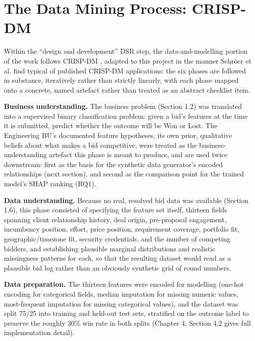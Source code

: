 \documentclass[12pt,oneside]{report}
\begin{document}
\hypertarget{the-data-mining-process-crisp-dm}{%
\section{The Data Mining Process:
CRISP-DM}\label{the-data-mining-process-crisp-dm}}

Within the ``design and development'' DSR step, the data-and-modelling
portion of the work follows CRISP-DM \citep{chapman2000crispdm}, adapted
to this project in the manner Schröer et al.
\citep{schroer2021systematic} find typical of published CRISP-DM
applications: the six phases are followed in substance, iteratively
rather than strictly linearly, with each phase mapped onto a concrete,
named artefact rather than treated as an abstract checklist item.

\textbf{Business understanding.} The business problem (Section 1.2) was
translated into a supervised binary classification problem: given a
bid's features at the time it is submitted, predict whether the outcome
will be Won or Lost. The Engineering BU's documented feature hypotheses,
its own prior, qualitative beliefs about what makes a bid competitive,
were treated as the business-understanding artefact this phase is meant
to produce, and are used twice downstream: first as the basis for the
synthetic data generator's encoded relationships (next section), and
second as the comparison point for the trained model's SHAP ranking
(RQ1).

\textbf{Data understanding.} Because no real, resolved bid data was
available (Section 1.6), this phase consisted of specifying the feature
set itself, thirteen fields spanning client relationship history, deal
origin, pre-proposal engagement, incumbency position, effort, price
position, requirement coverage, portfolio fit, geographic/timezone fit,
security credentials, and the number of competing bidders, and
establishing plausible marginal distributions and realistic missingness
patterns for each, so that the resulting dataset would read as a
plausible bid log rather than an obviously synthetic grid of round
numbers.

\textbf{Data preparation.} The thirteen features were encoded for
modelling (one-hot encoding for categorical fields, median imputation
for missing numeric values, most-frequent imputation for missing
categorical values), and the dataset was split 75/25 into training and
held-out test sets, stratified on the outcome label to preserve the
roughly 30\% win rate in both splits (Chapter 4, Section 4.2 gives full
implementation detail).
\end{document}
